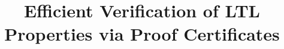 \documentclass[acmlarge]{acmart}
\begin{document}
\title{Efficient Verification of LTL Properties via Proof Certificates}









\end{document}
